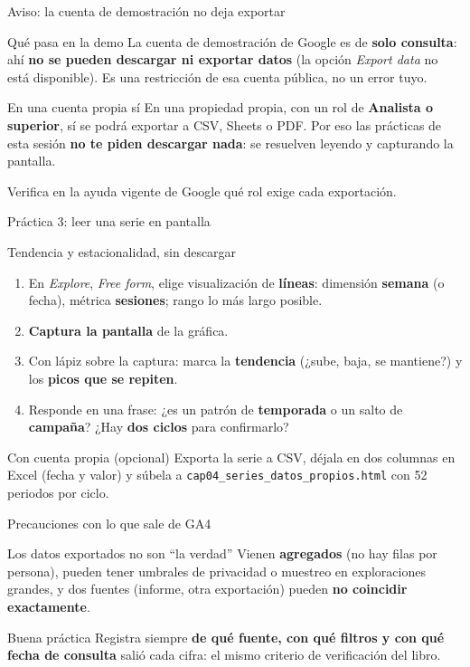 \documentclass[aspectratio=169,xcolor=dvipsnames]{beamer}
\begin{document}
\begin{frame}{Aviso: la cuenta de demostración no deja exportar}
\begin{alertblock}{Qué pasa en la demo}
  \small La cuenta de demostración de Google es de \textbf{solo consulta}: ahí \textbf{no se pueden descargar ni exportar datos} (la opción \textit{Export data} no está disponible). Es una restricción de esa cuenta pública, no un error tuyo.
\end{alertblock}
\begin{exampleblock}{En una cuenta propia sí}
  \small En una propiedad propia, con un rol de \textbf{Analista o superior}, sí se podrá exportar a CSV, Sheets o PDF. Por eso las prácticas de esta sesión \textbf{no te piden descargar nada}: se resuelven leyendo y capturando la pantalla.
\end{exampleblock}
\scriptsize Verifica en la ayuda vigente de Google qué rol exige cada exportación.
\end{frame}

\begin{frame}{Práctica 3: leer una serie en pantalla}
\begin{block}{Tendencia y estacionalidad, sin descargar}
  \footnotesize
  \begin{enumerate}
    \item En \textit{Explore}, \textit{Free form}, elige visualización de \textbf{líneas}: dimensión \textbf{semana} (o fecha), métrica \textbf{sesiones}; rango lo más largo posible.
    \item \textbf{Captura la pantalla} de la gráfica.
    \item Con lápiz sobre la captura: marca la \textbf{tendencia} (¿sube, baja, se mantiene?) y los \textbf{picos que se repiten}.
    \item Responde en una frase: ¿es un patrón de \textbf{temporada} o un salto de \textbf{campaña}? ¿Hay \textbf{dos ciclos} para confirmarlo?
  \end{enumerate}
\end{block}
\begin{exampleblock}{Con cuenta propia (opcional)}
  \scriptsize Exporta la serie a CSV, déjala en dos columnas en Excel (fecha y valor) y súbela a \texttt{cap04\_series\_datos\_propios.html} con 52 periodos por ciclo.
\end{exampleblock}
\end{frame}

\begin{frame}{Precauciones con lo que sale de GA4}
\begin{alertblock}{Los datos exportados no son \enquote{la verdad}}
  \small Vienen \textbf{agregados} (no hay filas por persona), pueden tener umbrales de privacidad o muestreo en exploraciones grandes, y dos fuentes (informe, otra exportación) pueden \textbf{no coincidir exactamente}.
\end{alertblock}
\begin{block}{Buena práctica}
  \small Registra siempre \textbf{de qué fuente, con qué filtros y con qué fecha de consulta} salió cada cifra: el mismo criterio de verificación del libro.
\end{block}
\end{frame}
\end{document}

